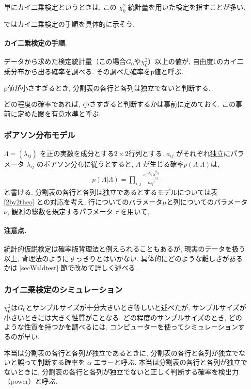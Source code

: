 \documentclass[a4paper, 12pt]{jarticle}
\begin{document}
単にカイ二乗検定というときは, この $\chi^2_0$ 統計量を用いた検定を指すことが多い. 

ではカイ二乗検定の手順を具体的に示そう. 

\paragraph{カイ二乗検定の手順.}
データから求めた検定統計量（この場合$G_0$や$\chi^2_0$）以上の値が, 自由度1のカイ二乗分布から出る確率を調べる. その調べた確率をp値と呼ぶ.

p値が小さすぎるとき, 分割表の各行と各列は独立でないと判断する.

どの程度の確率であれば, 小さすぎると判断するかは事前に定めておく. この事前に定めた閾を有意水準と呼ぶ.

\subsubsection{ポアソン分布モデル}
$\Lambda = (\lambda_{ij})$ を正の実数を成分とする$2 \times 2$行列とする. 
$a_{ij}$ がそれぞれ独立にパラメータ $\lambda_{ij}$ のポアソン分布に従うとすると, $A$ が生じる確率$p(A|\Lambda)$は, 
\begin{align}
p(A|\Lambda) = 
\prod_{i,j} \frac{e^{-\lambda_{ij}} \lambda_{ij}^{a_{ij}}}{a_{ij}!}
\end{align}
と書ける. 
分割表の各行と各列は独立であるとするモデルについては表\ref{2by2theo} との対応を考え, 行についてのパラメータ$\mu$と列についてのパラメータ$\nu$,  観測の総数を規定するパラメータ $\tau$ を用いて, 

\paragraph{注意点.}
統計的仮説検定は確率版背理法と例えられることもあるが, 現実のデータを扱う以上, 背理法のようにすっきりとはいかない. 
具体的にどのような難しさがあるかは \ref{secWaldtest} 節で改めて詳しく述べる. 

\subsubsection{カイ二乗検定のシミュレーション}
$\chi^2_0$は$G_0$とサンプルサイズが十分大きいとき等しいと述べたが, サンプルサイズが小さいときには大きく性質がことなる.
どの程度のサンプルサイズのとき, どのような性質を持つかを調べるには, コンピューターを使ってシミュレーションするのが早い. 

本当は分割表の各行と各列が独立であるときに, 分割表の各行と各列が独立でないと誤って判断する確率を $\alpha$ エラーと呼ぶ.
本当は分割表の各行と各列が独立でないときに, 分割表の各行と各列が独立でないと正しく判断する確率を検出力（power）と呼ぶ.
\end{document}
